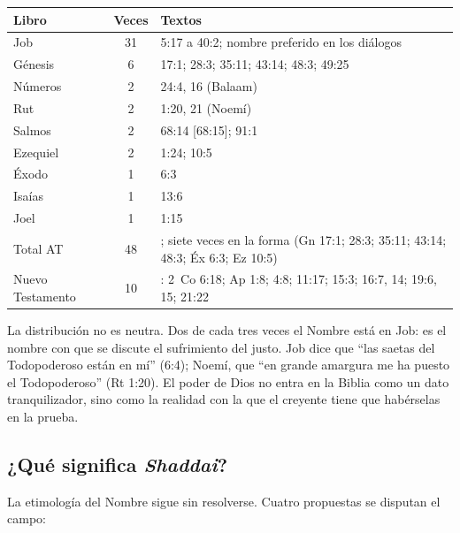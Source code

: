\begin{center}\small\renewcommand{\arraystretch}{1.2}
\begin{tabular}{@{}L{3.2cm}cL{9.6cm}@{}}
\toprule
\textbf{Libro} & \textbf{Veces} & \textbf{Textos} \\ \midrule
Job & 31 & 5:17 a 40:2; nombre preferido en los diálogos \\
Génesis & 6 & 17:1; 28:3; 35:11; 43:14; 48:3; 49:25 \\
Números & 2 & 24:4, 16 (Balaam) \\
Rut & 2 & 1:20, 21 (Noemí) \\
Salmos & 2 & 68:14 [68:15]; 91:1 \\
Ezequiel & 2 & 1:24; 10:5 \\
Éxodo & 1 & 6:3 \\
Isaías & 1 & 13:6 \\
Joel & 1 & 1:15 \\ \midrule
Total AT & 48 & ; siete veces en la forma  (Gn 17:1; 28:3; 35:11; 43:14; 48:3; Éx 6:3; Ez 10:5) \\
Nuevo Testamento & 10 & : 2~Co 6:18; Ap 1:8; 4:8; 11:17; 15:3; 16:7, 14; 19:6, 15; 21:22 \\
\bottomrule
\end{tabular}\end{center}


La distribución no es neutra. Dos de cada tres veces el Nombre está en Job: es el nombre con que se discute el sufrimiento del justo. Job dice que ``las saetas del Todopoderoso están en mí'' (6:4); Noemí, que ``en grande amargura me ha puesto el Todopoderoso'' (Rt 1:20). El poder de Dios no entra en la Biblia como un dato tranquilizador, sino como la realidad con la que el creyente tiene que habérselas en la prueba.

\subsection{¿Qué significa \emph{Shaddai}?}

La etimología del Nombre sigue sin resolverse. Cuatro propuestas se disputan el campo:

